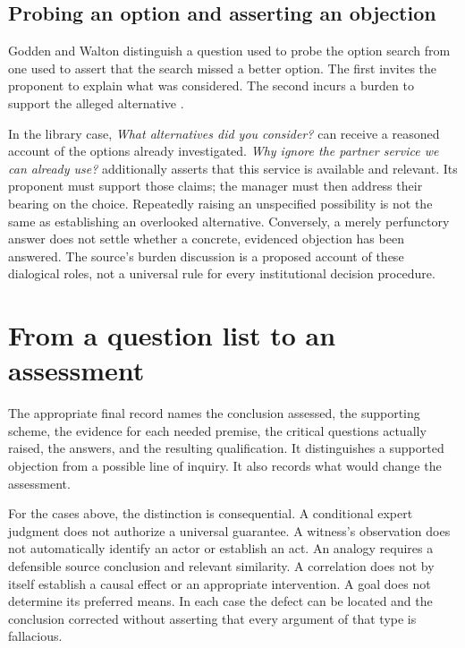 \subsection{Probing an option and asserting an objection}

Godden and Walton distinguish a question used to probe the option search
from one used to assert that the search missed a better option.
The first invites the proponent to explain what was considered.
The second incurs a burden to support the alleged alternative
\cite[pp.~283--287]{GoddenWalton2007SchemesQuestions}.

In the library case, \emph{What alternatives did you consider?} can
receive a reasoned account of the options already investigated.
\emph{Why ignore the partner service we can already use?} additionally
asserts that this service is available and relevant. Its proponent
must support those claims; the manager must then address their bearing
on the choice.
Repeatedly raising an unspecified possibility is not the same as
establishing an overlooked alternative. Conversely, a merely perfunctory
answer does not settle whether a concrete, evidenced objection has
been answered. The source's burden discussion is a proposed account
of these dialogical roles, not a universal rule for every institutional
decision procedure.

\section{From a question list to an assessment}

The appropriate final record names the conclusion assessed, the supporting
scheme, the evidence for each needed premise, the critical questions
actually raised, the answers, and the resulting qualification.
It distinguishes a supported objection from a possible line of inquiry.
It also records what would change the assessment.

For the cases above, the distinction is consequential. A conditional
expert judgment does not authorize a universal guarantee. A witness's
observation does not automatically identify an actor or establish an act.
An analogy requires a defensible source conclusion and relevant similarity.
A correlation does not by itself establish a causal effect or an
appropriate intervention. A goal does not determine its preferred means.
In each case the defect can be located and the conclusion corrected
without asserting that every argument of that type is fallacious.

